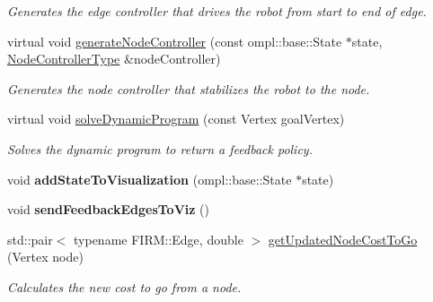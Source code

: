 \begin{DoxyCompactItemize}
\begin{DoxyCompactList}\small\item\em \-Generates the edge controller that drives the robot from start to end of edge. \end{DoxyCompactList}\item 
\hypertarget{class_f_i_r_m_a1856164aa0dba82e6cfad26a4ef5a7fe}{virtual void \hyperlink{class_f_i_r_m_a1856164aa0dba82e6cfad26a4ef5a7fe}{generate\-Node\-Controller} (const ompl\-::base\-::\-State $\ast$state, \hyperlink{class_controller}{\-Node\-Controller\-Type} \&node\-Controller)}\label{class_f_i_r_m_a1856164aa0dba82e6cfad26a4ef5a7fe}

\begin{DoxyCompactList}\small\item\em \-Generates the node controller that stabilizes the robot to the node. \end{DoxyCompactList}\item 
virtual void \hyperlink{class_f_i_r_m_a7ffdc57247b8f40899646195750b6a20}{solve\-Dynamic\-Program} (const \-Vertex goal\-Vertex)
\begin{DoxyCompactList}\small\item\em \-Solves the dynamic program to return a feedback policy. \end{DoxyCompactList}\item 
\hypertarget{class_f_i_r_m_a4003d4144f6c32e9eaba79f292ec9ce4}{void {\bfseries add\-State\-To\-Visualization} (ompl\-::base\-::\-State $\ast$state)}\label{class_f_i_r_m_a4003d4144f6c32e9eaba79f292ec9ce4}

\item 
\hypertarget{class_f_i_r_m_a8d9e316c11b1e2ff52b5ff65996d3a01}{void {\bfseries send\-Feedback\-Edges\-To\-Viz} ()}\label{class_f_i_r_m_a8d9e316c11b1e2ff52b5ff65996d3a01}

\item 
\hypertarget{class_f_i_r_m_a44321fba1c038c1f43ccfeccf9a1c44c}{std\-::pair$<$ typename \-F\-I\-R\-M\-::\-Edge, \*
double $>$ \hyperlink{class_f_i_r_m_a44321fba1c038c1f43ccfeccf9a1c44c}{get\-Updated\-Node\-Cost\-To\-Go} (\-Vertex node)}\label{class_f_i_r_m_a44321fba1c038c1f43ccfeccf9a1c44c}

\begin{DoxyCompactList}\small\item\em \-Calculates the new cost to go from a node. \end{DoxyCompactList}\end{DoxyCompactItemize}
